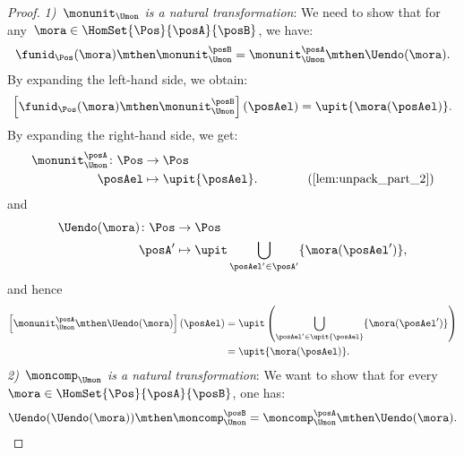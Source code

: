 \begin{proof}
    \emph{1)~$\monunit_{\Umon}$ is a natural transformation}:
    We need to show that for any~$\mora\in \HomSet{\Pos}{\posA}{\posB}$, we have:
    \begin{equation}
        \funid_{\Pos}(\mora)\mthen \monunit_{\Umon}^\posB=\monunit_{\Umon}^\posA\mthen \Uendo(\mora).
    \end{equation}
    By expanding the left-hand side, we obtain:
    \begin{equation}
        \left[\funid_{\Pos}(\mora)\mthen \monunit_{\Umon}^\posB\right](\posAel)=\upit \{\mora(\posAel)\}.
    \end{equation}
    By expanding the right-hand side, we get:
    \begin{equation}
        \begin{aligned}
            \monunit_{\Umon}^\posA\colon \Pos & \to \Pos                                                            \\
            \posAel                           & \mapsto \upit \{\posAel\}. \qquad \qquad (\cref{lem:unpack_part_2})
        \end{aligned}
    \end{equation}
    and
    \begin{equation}
        \begin{aligned}
            \Uendo(\mora)\colon \Pos & \to \Pos                                                       \\
            \posA'                   & \mapsto \upit \bigcup_{\posAel'\in \posA'}\{\mora(\posAel')\},
        \end{aligned}
    \end{equation}
    and hence
    \begin{equation}
        \begin{aligned}
            \left[\monunit_{\Umon}^\posA\mthen \Uendo(\mora)\right](\posAel) & =\upit \left( \bigcup_{\posAel'\in \upit \{\posAel\}} \{\mora(\posAel')\}\right) \\
                                                                             & =\upit \{\mora(\posAel)\}.
        \end{aligned}
    \end{equation}
    \emph{2)~$\moncomp_{\Umon}$ is a natural transformation}:
    We want to show that for every~$\mora\in \HomSet{\Pos}{\posA}{\posB}$, one has:
    \begin{equation}
        \Uendo(\Uendo(\mora))\mthen \moncomp_{\Umon}^{\posB}=\moncomp_{\Umon}^\posA \mthen \Uendo(\mora).

\end{equation}
\end{proof}

